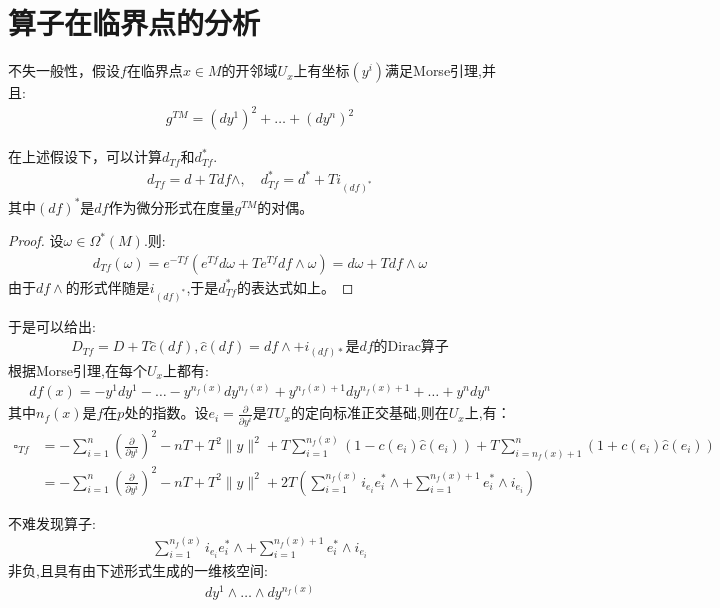 \section{算子在临界点的分析}
不失一般性，假设$f$在临界点$x \in M$的开邻域$U_x$上有坐标$(y^i)$满足Morse引理,并且:
\begin{align}
	g^{TM}=(dy^1)^2+\dots+(dy^n)^2
\end{align}
\begin{proposition}
   在上述假设下，可以计算$d_{Tf}$和$d_{Tf}^*$.
    \begin{align}
	d_{Tf}=d+Tdf\wedge, \quad d_{Tf}^*=d^*+Ti_{(df)^*}
    \end{align}
其中$(df)^*$是$df$作为微分形式在度量$g^{TM}$的对偶。
\end{proposition}
\begin{proof}
	设$\omega \in \Omega^*(M)$.则:
	\begin{align}
		d_{Tf}(\omega)=e^{-Tf}(e^{Tf}d\omega+Te^{Tf}df\wedge \omega)=d\omega+Tdf\wedge \omega
	\end{align}
	由于$df\wedge$的形式伴随是$i_{(df)^*}$,于是$d_{Tf}^*$的表达式如上。
\end{proof}
于是可以给出:
\begin{align}
	D_{Tf}=D+T\hat{c}(df),\hat{c}(df)=df\wedge+i_{(df)*} \text{是}df\text{的Dirac算子}
\end{align}
根据Morse引理,在每个$U_x$上都有:
\begin{align}
	df(x)=-y^1dy^1-\dots-y^{n_f(x)}dy^{n_f(x)}+y^{n_f(x)+1}dy^{n_f(x)+1}+\dots+y^ndy^n
\end{align}
其中$n_f(x)$是$f$在$p$处的指数。设$e_i=\frac{\partial}{\partial y^i}$是$TU_x$的定向标准正交基础,则在$U_x$上,有：
\begin{align}
	\square_{Tf}&=-\sum_{i=1}^n (\frac{\partial}{\partial y^i})^2-nT+T^2\|y\|^2+T\sum_{i=1}^{n_f(x)}(1-c(e_i)\hat{c}(e_i))+T\sum_{i=n_f(x)+1}^n(1+c(e_i)\hat{c}(e_i))\\&=-\sum_{i=1}^n (\frac{\partial}{\partial y^i})^2-nT+T^2\|y\|^2+2T(\sum_{i=1}^{n_f(x)}i_{e_i}e_i^*\wedge+\sum_{i=1}^{n_f(x)+1}e_i^*\wedge i_{e_i})
\end{align}

不难发现算子:
\begin{align*}
	\sum_{i=1}^{n_f(x)}i_{e_i}e_i^*\wedge+\sum_{i=1}^{n_f(x)+1}e_i^*\wedge i_{e_i}
\end{align*}
非负,且具有由下述形式生成的一维核空间:
\begin{align*}
	dy^1\wedge \dots \wedge dy^{n_f(x)}
\end{align*}

